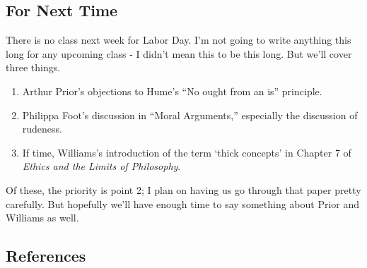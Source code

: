 \documentclass[
]{article}
\providecommand{\tightlist}{%
  \setlength{\itemsep}{0pt}\setlength{\parskip}{0pt}}
\begin{document}
\hypertarget{for-next-time}{%
\subsection{For Next Time}\label{for-next-time}}

There is no class next week for Labor Day. I'm not going to write
anything this long for any upcoming class - I didn't mean this to be
this long. But we'll cover three things.

\begin{enumerate}
\def\labelenumi{\arabic{enumi}.}
\tightlist
\item
  Arthur Prior's objections to Hume's ``No ought from an is'' principle.
\item
  Philippa Foot's discussion in ``Moral Arguments,'' especially the
  discussion of rudeness.
\item
  If time, Williams's introduction of the term `thick concepts' in
  Chapter 7 of \emph{Ethics and the Limits of Philosophy}.
\end{enumerate}

Of these, the priority is point 2; I plan on having us go through that
paper pretty carefully. But hopefully we'll have enough time to say
something about Prior and Williams as well.

\hypertarget{references}{%
\subsection*{References}\label{references}}
\end{document}
